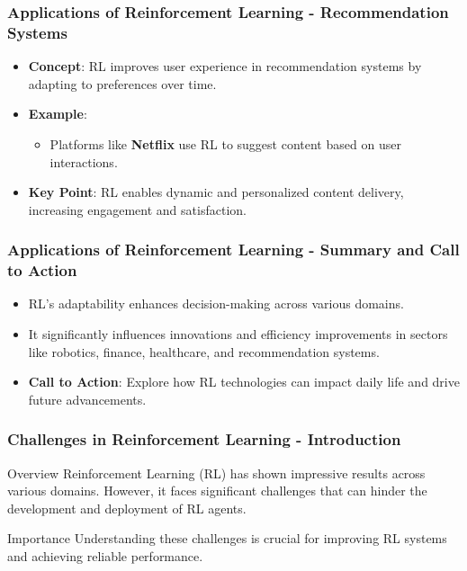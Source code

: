 \documentclass[aspectratio=169]{beamer}
\begin{document}
\begin{frame}[fragile]
    \frametitle{Applications of Reinforcement Learning - Recommendation Systems}
    \begin{itemize}
        \item \textbf{Concept}: RL improves user experience in recommendation systems by adapting to preferences over time.
        \item \textbf{Example}: 
            \begin{itemize}
                \item Platforms like \textbf{Netflix} use RL to suggest content based on user interactions.
            \end{itemize}
        \item \textbf{Key Point}: RL enables dynamic and personalized content delivery, increasing engagement and satisfaction.
    \end{itemize}
\end{frame}

\begin{frame}[fragile]
    \frametitle{Applications of Reinforcement Learning - Summary and Call to Action}
    \begin{itemize}
        \item RL's adaptability enhances decision-making across various domains.
        \item It significantly influences innovations and efficiency improvements in sectors like robotics, finance, healthcare, and recommendation systems.
        \item \textbf{Call to Action}: Explore how RL technologies can impact daily life and drive future advancements.
    \end{itemize}
\end{frame}

\begin{frame}[fragile]
    \frametitle{Challenges in Reinforcement Learning - Introduction}
    \begin{block}{Overview}
        Reinforcement Learning (RL) has shown impressive results across various domains. However, it faces significant challenges that can hinder the development and deployment of RL agents. 
    \end{block}
    \begin{block}{Importance}
        Understanding these challenges is crucial for improving RL systems and achieving reliable performance.
    \end{block}
\end{frame}
\end{document}
